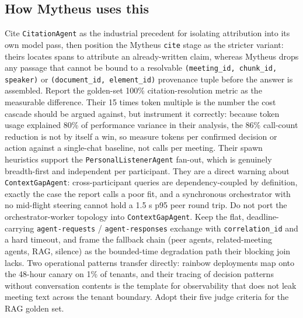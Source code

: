 \subsection{How Mytheus uses this}
\begin{takeaway}
Cite \texttt{CitationAgent} as the industrial precedent for isolating attribution into its own model pass, then position the Mytheus \texttt{cite} stage as the stricter variant: theirs locates spans to attribute an already-written claim, whereas Mytheus drops any passage that cannot be bound to a resolvable \texttt{(meeting\_id, chunk\_id, speaker)} or \texttt{(document\_id, element\_id)} provenance tuple before the answer is assembled. Report the golden-set 100\% citation-resolution metric as the measurable difference. Their 15 times token multiple is the number the cost cascade should be argued against, but instrument it correctly: because token usage explained 80\% of performance variance in their analysis, the 86\% call-count reduction is not by itself a win, so measure tokens per confirmed decision or action against a single-chat baseline, not calls per meeting. Their spawn heuristics support the \texttt{PersonalListenerAgent} fan-out, which is genuinely breadth-first and independent per participant. They are a direct warning about \texttt{ContextGapAgent}: cross-participant queries are dependency-coupled by definition, exactly the case the report calls a poor fit, and a synchronous orchestrator with no mid-flight steering cannot hold a 1.5 s p95 peer round trip. Do not port the orchestrator-worker topology into \texttt{ContextGapAgent}. Keep the flat, deadline-carrying \texttt{agent-requests} / \texttt{agent-responses} exchange with \texttt{correlation\_id} and a hard timeout, and frame the fallback chain (peer agents, related-meeting agents, RAG, silence) as the bounded-time degradation path their blocking join lacks. Two operational patterns transfer directly: rainbow deployments map onto the 48-hour canary on 1\% of tenants, and their tracing of decision patterns without conversation contents is the template for observability that does not leak meeting text across the tenant boundary. Adopt their five judge criteria for the RAG golden set.
\end{takeaway}


